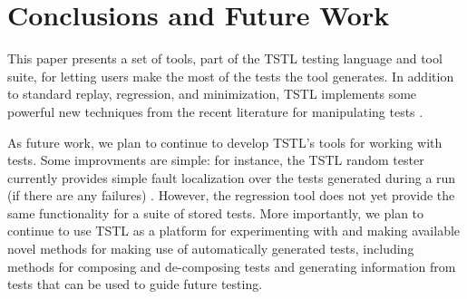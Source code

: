 \section{Conclusions and Future Work}

This paper presents a set of tools, part of the TSTL \cite{tstlsttt}
testing language and tool suite, for letting users make the most of the
tests the tool generates.  In addition to standard
replay, regression, and minimization, TSTL implements some powerful
new techniques from the recent literature for manipulating tests
\cite{OneTest,slippage}.

As future work, we plan to continue to develop TSTL's tools for
working with tests.  Some improvments are simple:  for instance, the TSTL
random tester currently provides simple fault localization over the
tests generated during a run (if there are any failures)
\cite{Tarantula}.  However, the regression tool does not yet provide
the same functionality for a suite of stored tests.  More importantly,
we plan to continue to use TSTL as a platform for experimenting with
and making available novel methods for making use of automatically
generated tests, including methods for composing and de-composing
tests and generating information from tests that can be used to guide
future testing.